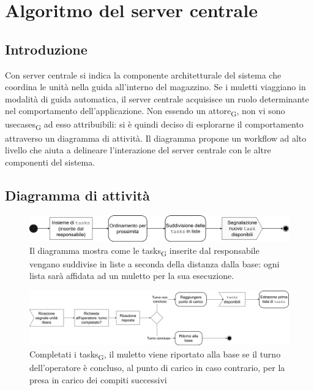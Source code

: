 \section{Algoritmo del server centrale}
\subsection{Introduzione}
Con server centrale si indica la componente architetturale del sistema che coordina le unità nella guida all'interno del magazzino. Se i muletti viaggiano in modalità di guida automatica, il server centrale acquisisce un ruolo determinante nel comportamento dell'applicazione. Non essendo un \gls{attore}\textsubscript{G}, non vi sono \glspl{usecase}\textsubscript{G} ad esso attribuibili: si è quindi deciso di esplorarne il comportamento attraverso un diagramma di attività. Il diagramma propone un workflow ad alto livello che aiuta a delineare l'interazione del server centrale con le altre componenti del sistema.



\subsection{Diagramma di attività}

\begin{figure}[H]
	\centering
	\includegraphics[scale=0.35]{res/images/diagramma_di_attivita3.png}
	\caption[Diagramma di attività per l'ordinamento  delle tasks]{Il diagramma mostra come le \glspl{task}\textsubscript{G} inserite dal responsabile vengano suddivise in liste a seconda della distanza dalla base: ogni lista sarà affidata ad un muletto per la sua esecuzione.}
\end{figure}

\begin{figure}[H]
	\centering
	\includegraphics[scale=0.35]{res/images/diagramma_di_attivita1.png}
	\caption[Diagramma di attività per la gestione del muletto dopo il completamento della lista di tasks]{Completati i \glspl{task}\textsubscript{G}, il muletto viene riportato alla base se il turno dell'operatore è concluso, al punto di carico in caso contrario, per la presa in carico dei compiti successivi}
\end{figure}




